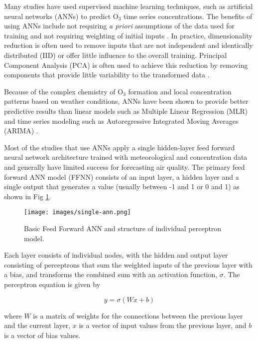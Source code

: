 \documentclass[preprint,12pt,authoryear]{elsarticle}
\begin{document}
\begin{linenumbers}
Many studies have used supervised machine learning techniques, such as artificial neural networks (ANNs) to predict O$_{3}$ \citep{Comrie1997, Dorling2003, Ettouney2009a, Kurt2008, Biancofiore2017} time series concentrations. The benefits of using ANNs include not requiring \textit{a priori} assumptions of the data used for training and not requiring weighting of initial inputs \citep{Gardner1998}. In practice, dimensionality reduction is often used to remove inputs that are not independent and identically distributed (IID) or offer little influence to the overall training. Principal Component Analysis (PCA) is often used to achieve this reduction by removing components that provide little variability to the transformed data \citep{Singh2013, Wang2015a}.

Because of the complex chemistry of O$_{3}$ formation and local concentration patterns based on weather conditions, ANNs have been shown to provide better predictive results than linear models such as Multiple Linear Regression (MLR) and time series modeling such as Autoregressive Integrated Moving Averages (ARIMA) \citep{Gardner1998, Prybutok2000}. 

Most of the studies that use ANNs apply a single hidden-layer feed forward neural network architecture trained with meteorological and concentration data and generally have limited success for forecasting air quality. The primary feed forward ANN model (FFNN) consists of an input layer, a hidden layer and a single output that generates a value (usually between -1 and 1 or 0 and 1) as shown in Fig \ref{fig:SingleANN}. \\
%
\begin{figure}[H]
\centering
\texttt{[image: images/single-ann.png]} 
\caption{Basic Feed Forward ANN and structure of individual perceptron model.}
\label{fig:SingleANN}
\end{figure}
%
Each layer consists of individual nodes, with the hidden and output layer consisting of perceptrons that sum the weighted inputs of the previous layer with a bias, and transforms the combined sum with an activation function, $\sigma$. The perceptron equation is given by

\begin{equation}
\label{eq:perceptron}
y= \sigma(Wx+b)
\end{equation}

where $W$ is a matrix of weights for the connections between the previous layer and the current layer, $x$ is a vector of input values from the previous layer, and $b$ is a vector of bias values. 


\end{linenumbers}
\end{document}
